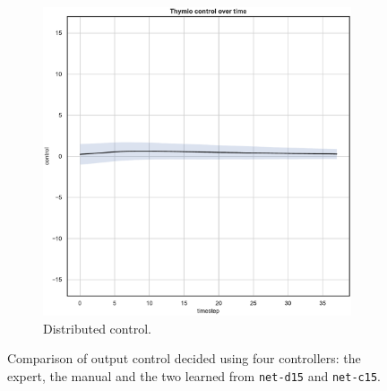 \begin{figure}[H]
\begin{center}
\begin{subfigure}[h]{0.35\textwidth}
			\includegraphics[width=\textwidth]{contents/images/net-d15/control-overtime-learned_distributed}
			\caption{Distributed control.}
		\end{subfigure}
	\end{center}
	\caption[Evaluation of the control decided by \texttt{net-c15}.]{Comparison of 
	output control decided using four controllers: the expert, the manual and the 
	two learned from \texttt{net-d15} and \texttt{net-c15}.}
\end{figure}
